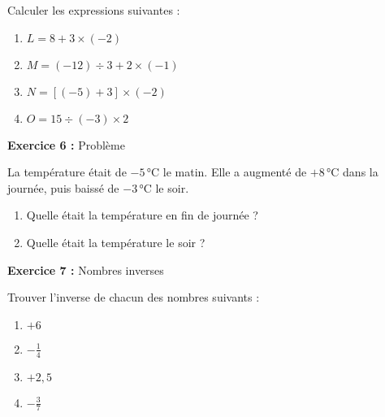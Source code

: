\begin{exercisebox}
Calculer les expressions suivantes :
\begin{enumerate}[label=\alph*)]
	\item $L = 8 + 3 \times (-2)$
	\item $M = (-12) \div 3 + 2 \times (-1)$
	\item $N = [(-5) + 3] \times (-2)$
	\item $O = 15 \div (-3) \times 2$
\end{enumerate}

\textbf{Exercice 6 :} Problème

La température était de $-5\,\text{°C}$ le matin. Elle a augmenté de $+8\,\text{°C}$ dans la journée, puis baissé de $-3\,\text{°C}$ le soir.

\begin{enumerate}[label=\alph*)]
	\item Quelle était la température en fin de journée ?
	\item Quelle était la température le soir ?
\end{enumerate}
\end{exercisebox}

\begin{exercisebox}
\textbf{Exercice 7 :} Nombres inverses

Trouver l'inverse de chacun des nombres suivants :
\begin{enumerate}[label=\alph*)]
	\item $+6$
	\item $-\frac{1}{4}$
	\item $+2,5$
	\item $-\frac{3}{7}$
\end{enumerate}
\end{exercisebox}

